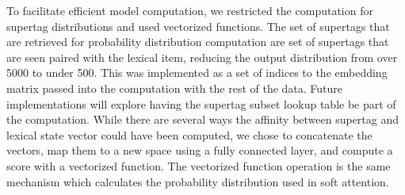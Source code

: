 \documentclass[11pt]{article}
\begin{document}
To facilitate efficient model computation, we restricted the computation for supertag distributions and used vectorized functions.
%
The set of supertags that are retrieved for probability distribution computation are set of supertags that are seen paired with the lexical item, reducing the output distribution from over 5000 to under 500.  
%
This was implemented as a set of indices to the embedding matrix passed into the computation with the rest of the data. 
%
Future implementations will explore having the supertag subset lookup table be part of the computation.
%
While there are several ways the affinity between supertag and lexical state vector could have been computed, we chose to concatenate the vectors, map them to a new space using a fully connected layer, and compute a score with a vectorized function.
%
The vectorized function operation is the same mechanism which calculates the probability distribution used in soft attention. 
\end{document}
